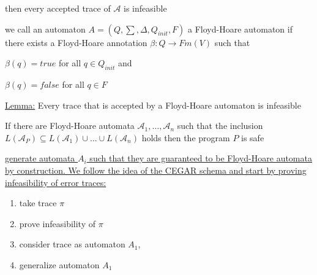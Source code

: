 \documentclass[landscape, a4paper]{article}
\begin{document}
\begin{minipage}[t]{0.2\linewidth}
\begin{betterlist}
		then every accepted trace of $\mathcal{A}$ is infeasible\color{black}
		\item \color{orange}we call an automaton $A = (Q, \sum , \Delta , Q_{init}, F)$ a \alert{Floyd-Hoare automaton} if there exists a Floyd-Hoare annotation $\beta  : Q \rightarrow Fm(V)$ such that
		\begin{betterlist}
			\item $\beta(q) = true$ for all $q \in Q_{init}$ and
			\item $\beta(q) = false$ for all $q \in F$
		\end{betterlist}\color{black}
		\item \underline{Lemma:} Every trace that is accepted by a Floyd-Hoare automaton is infeasible
		\item If there are Floyd-Hoare automata $\mathcal{A}_{1}, \ldots, \mathcal{A}_{n}$ such that the inclusion $L(\mathcal{A}_P) \subseteq L(\mathcal{A}_{1}) \cup . . . \cup L(\mathcal{A}_{n})$ holds then the program $P$ is safe
		\item \uline{generate automata $A_i$ such that they are guaranteed to be Floyd-Hoare automata by construction. We follow the idea of the CEGAR schema and start by proving infeasibility of error traces:}
		\begin{enumerate}
			\item take trace $\pi$
			\item prove infeasibility of $\pi$
			\item consider trace as automaton $A_1$,
			\item generalize automaton $A_1$
		\end{enumerate}
	\end{betterlist}


\end{minipage}
\end{document}
